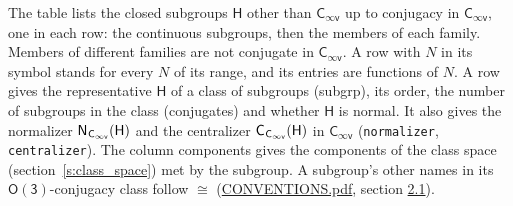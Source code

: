 \documentclass[10pt,a4paper]{article}
\numberwithin{equation}{section}
\newcommand{\grp}[1]{\mathsf{#1}}
\newcommand{\samecls}{\cong}
\newcommand{\hairsp}{\mkern1mu}
\begin{document}
\leavevmode\label{n:group.H}The table lists the closed subgroups $\grp{H}$ other than $\grp{C_{\infty v}}$ up to conjugacy in $\grp{C_{\infty v}}$, one in each row: the continuous subgroups, then the members of each family. Members of different families are not conjugate in $\grp{C_{\infty v}}$. A row with $N$ in its symbol stands for every $N$ of its range, and its entries are functions of $N$. \label{n:head.subgroup}\label{n:head.order}\label{n:head.conjugates}\label{n:head.normal}A row gives the representative $\grp{H}$ of a class of subgroups (subgrp), its order, the number of subgroups in the class (conjugates) and whether $\grp{H}$ is normal. \label{n:group.normalizer}\label{n:group.centralizer}It also gives the normalizer $\grp{N}_{\hairsp \grp{C_{\infty v}}}(\grp{H})$ and the centralizer $\grp{C}_{\hairsp \grp{C_{\infty v}}}(\grp{H})$ in $\grp{C_{\infty v}}$ (\texttt{normalizer}, \texttt{centralizer}). \label{n:head.components}The column components gives the components of the class space (section~\ref{s:class_space}) met by the subgroup. A subgroup's other names in its \href{O3.pdf}{$\grp{O(3)}$}-conjugacy class follow $\samecls$ (\href{../../CONVENTIONS.pdf}{CONVENTIONS.pdf}, section \href{../../CONVENTIONS.pdf\#conv.2.1}{2.1}).
\end{document}
